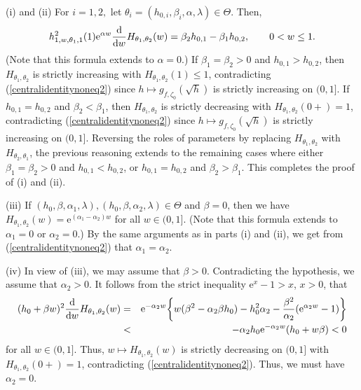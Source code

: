 \documentclass[number,citesort,seceqn,dvips]{arxbj}
\newcommand{\eqref}[1]{(\ref{#1})}
\begin{document}
(i) and (ii)   For $i=1,2,$ let
$\theta_i=(h_{0,i},\beta_i,\alpha,\lambda)\in\Theta$. Then,\vspace*{-1pt}
%
\[
h^2_{1,w,\theta_1,1}(1) \mathrm{e}^{\alpha w} \frac{\mathrm{d}}{\mathrm{d}w}H_{\theta
_1,\theta_2}(w) = \beta_2 h_{0,1}-\beta_1 h_{0,2},\qquad 0< w\le
1 .\vspace*{-2pt}
\]
%
(Note that this formula extends to $\alpha=0$.) If
$\beta_1 = \beta_2 > 0$ and $h_{0,1} > h_{0,2}$, then
$H_{\theta_1,\theta_2}$ is strictly increasing with
$H_{\theta_1,\theta_2}(1) \le1$, contradicting
\eqref{centralidentitynoneq2} since $h\mapsto
g_{f, \zeta_0}(\sqrt{h})$ is strictly increasing on $(0,1]$. If
$h_{0,1} = h_{0,2}$ and $\beta_2 < \beta_1$, then
$H_{\theta_1,\theta_2}$ is strictly decreasing with
$H_{\theta_1,\theta_2}(0+)=1$, contradicting
\eqref{centralidentitynoneq2} since $h\mapsto
g_{f, \zeta_0}(\sqrt{h})$ is strictly increasing on $(0,1]$. Reversing
the roles of parameters by replacing $H_{\theta_1,\theta_2}$ with
$H_{\theta_2,\theta_1}$, the previous reasoning extends to the
remaining cases where either $\beta_1 = \beta_2 > 0$ and
$h_{0,1} < h_{0,2}$, or $h_{0,1} = h_{0,2}$ and
$\beta_2 > \beta_1$. This completes the proof
of (i) and (ii).

(iii)   If
$(h_{0},\beta,\alpha_1,\lambda),(h_{0},\beta,\alpha_2,\lambda)\in
\Theta$
and $\beta=0$, then we have
$H_{\theta_1,\theta_2}(w)=\mathrm{e}^{(\alpha_1-\alpha_2)w}$ for all
$w\in(0,1]$. (Note that this formula extends to $\alpha_1=0$ or
$\alpha_2=0$.) By the same arguments as in parts (i) and (ii), we get
from \eqref{centralidentitynoneq2} that
$\alpha_1=\alpha_2$.

(iv)   In view of (iii), we may assume that $\beta>0$. Contradicting
the hypothesis, we assume that $\alpha_2>0$. It follows from the strict
inequality $\mathrm{e}^x-1>x$, $x>0$, that\vspace*{-1pt}
%
\begin{eqnarray*}
(h_0+\beta w)^2 \frac{\mathrm{d}}{\mathrm{d}w}H_{\theta_1,\theta_2}(w)
&=&\mathrm{e}^{-\alpha_2w} \biggl\{w(\beta^2 - \alpha_2\beta
h_0)-h_0^2\alpha_2 - \frac{\beta^2}{\alpha_2}
(\mathrm{e}^{\alpha_2w} - 1) \biggr\}\\[-1pt]
&<&-\alpha_2 h_0 \mathrm{e}^{-\alpha_2 w}(h_0+w\beta) < 0\vspace*{-2pt}
\end{eqnarray*}
%
for all $w\in(0,1]$. Thus, $w\mapsto H_{\theta_1,\theta_2}(w)$ is
strictly decreasing on $(0,1]$ with $H_{\theta_1,\theta_2}(0+)=1$,
contradicting \eqref{centralidentitynoneq2}. Thus, we must have
$\alpha_2=0$.\vadjust{\goodbreak}
\end{document}
